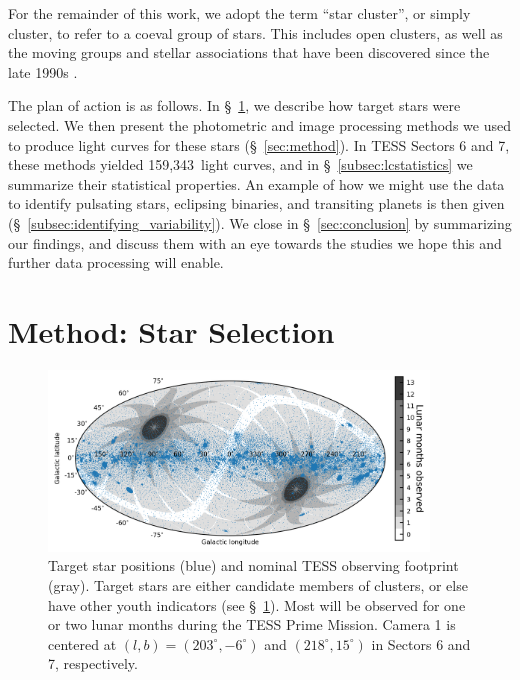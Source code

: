 \documentclass[12pt,twocolumn,tighten]{aastex62}
\newcommand{\numberlcs}{159{,}343\ } %
\begin{document}
For the remainder of this work, we adopt the term ``star cluster'', or
simply cluster, to refer to a coeval group of stars.  This includes
open clusters, as well as the moving groups and stellar associations
that have been discovered since the late 1990s
\citep{zuckerman_young_2004}. 

The plan of action is as follows. In \S~\ref{sec:starselection}, we
describe how target stars were selected. We then present the
photometric and image processing methods we used to produce light
curves for these stars (\S~\ref{sec:method}).  In TESS Sectors 6 and
7, these methods yielded \numberlcs light curves, and in
\S~\ref{subsec:lcstatistics} we summarize their statistical properties.
An example of how we might use the data to identify pulsating stars,
eclipsing binaries, and transiting planets is then given
(\S~\ref{subsec:identifying_variability}).  We close in
\S~\ref{sec:conclusion} by summarizing our findings, and discuss them
with an eye towards the studies we hope this and further data
processing will enable.


\section{Method: Star Selection}
\label{sec:starselection}

\begin{figure}[!t]
	\begin{center}
		\leavevmode
		\includegraphics[width=0.9\textwidth]{target_star_positions.png}
	\end{center}
	\vspace{-0.5cm}
	\caption{
    Target star positions (blue) and nominal TESS observing
    footprint (gray).  Target stars are either candidate members of
    clusters, or else have other youth indicators (see
    \S~\ref{sec:starselection}).  Most will be observed for one or two
    lunar months during the TESS Prime Mission.
    Camera 1 is centered at $(l,b)=(203^\circ, -6^\circ)$ and $(218^\circ,15^\circ)$ in Sectors 6 and 7, respectively.
    \label{fig:cdips_targets_positions}
	}
\end{figure}
\end{document}
